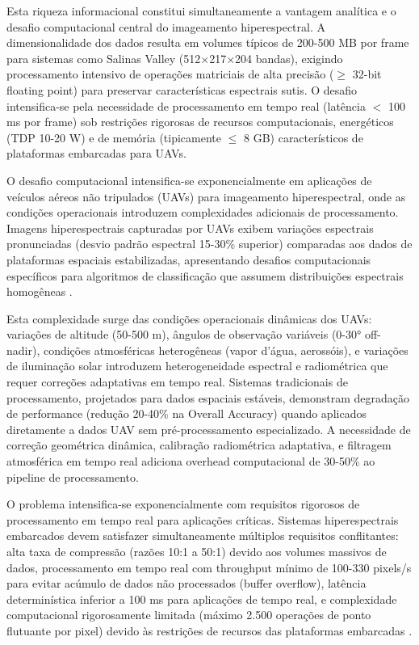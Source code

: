 Esta riqueza informacional constitui simultaneamente a vantagem analítica 
e o desafio computacional central do imageamento hiperespectral. A dimensionalidade 
dos dados resulta em volumes típicos de 200-500 MB por frame para sistemas 
como Salinas Valley (512×217×204 bandas), exigindo processamento intensivo 
de operações matriciais de alta precisão ($\geq$ 32-bit floating point) para 
preservar características espectrais sutis. O desafio intensifica-se pela 
necessidade de processamento em tempo real (latência $<$ 100 ms por frame) 
sob restrições rigorosas de recursos computacionais, energéticos (TDP 10-20 W) 
e de memória (tipicamente $\leq$ 8 GB) característicos de plataformas embarcadas 
para UAVs.

O desafio computacional intensifica-se exponencialmente em aplicações de 
veículos aéreos não tripulados (UAVs) para imageamento hiperespectral, onde 
as condições operacionais introduzem complexidades adicionais de processamento. 
Imagens hiperespectrais capturadas por UAVs exibem variações espectrais 
pronunciadas (desvio padrão espectral 15-30\% superior) comparadas aos dados 
de plataformas espaciais estabilizadas, apresentando desafios computacionais 
específicos para algoritmos de classificação que assumem distribuições 
espectrais homogêneas \cite{Zhang2024}.

Esta complexidade surge das condições operacionais dinâmicas dos UAVs: 
variações de altitude (50-500 m), ângulos de observação variáveis (0-30° 
off-nadir), condições atmosféricas heterogêneas (vapor d'água, aerossóis), 
e variações de iluminação solar introduzem heterogeneidade espectral e 
radiométrica que requer correções adaptativas em tempo real. Sistemas 
tradicionais de processamento, projetados para dados espaciais estáveis, 
demonstram degradação de performance (redução 20-40\% na Overall Accuracy) 
quando aplicados diretamente a dados UAV sem pré-processamento especializado. 
A necessidade de correção geométrica dinâmica, calibração radiométrica 
adaptativa, e filtragem atmosférica em tempo real adiciona overhead 
computacional de 30-50\% ao pipeline de processamento.

O problema intensifica-se exponencialmente com requisitos rigorosos de 
processamento em tempo real para aplicações críticas. Sistemas hiperespectrais 
embarcados devem satisfazer simultaneamente múltiplos requisitos conflitantes: 
alta taxa de compressão (razões 10:1 a 50:1) devido aos volumes massivos de 
dados, processamento em tempo real com throughput mínimo de 100-330 pixels/s 
para evitar acúmulo de dados não processados (buffer overflow), latência 
determinística inferior a 100 ms para aplicações de tempo real, e complexidade 
computacional rigorosamente limitada (máximo 2.500 operações de ponto flutuante 
por pixel) devido às restrições de recursos das plataformas embarcadas 
\cite{Diaz2019}.

